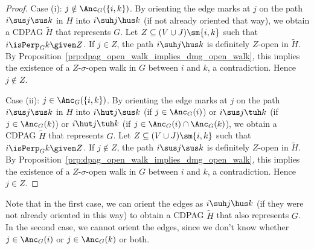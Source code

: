 \begin{proof}
%

  Case (i): $j \notin \Anc_G(\{i,k\})$. 
  By orienting the edge marks at $j$ on the path $i \sus j \sus k$ in $H$ into $i \suh j \hus k$ (if not already oriented that way), we obtain a CDPAG $\tilde{H}$ that represents $G$.
  Let $Z \subseteq (V \cup J) \sm \{i,k\}$ such that $i \isPerp_G k \given Z$. 
  If $j \in Z$, the path $i \suh j \hus k$ is definitely $Z$-open in $\tilde{H}$.
  By Proposition~\ref{prp:dpag_open_walk_implies_dmg_open_walk}, this implies the existence of a $Z$-$\sigma$-open walk in $G$ between $i$ and $k$, a contradiction.
  Hence $j \notin Z$.

  Case (ii): $j \in \Anc_G(\{i,k\})$.
  By orienting the edge marks at $j$ on the path $i \sus j \sus k$ in $H$ into $i \hut j \sus k$ (if $j \in \Anc_G(i)$) or $i \sus j \tuh k$ (if $j \in \Anc_G(k)$) or $i \hut j \tuh k$ (if $j \in \Anc_G(i) \cap \Anc_G(k)$), we obtain a CDPAG $\tilde{H}$ that represents $G$.
  Let $Z \subseteq (V \cup J) \sm \{i,k\}$ such that $i \isPerp_G k \given Z$. 
  If $j \notin Z$, the path $i \sus j \sus k$ is definitely $Z$-open in $\tilde{H}$.
  By Proposition~\ref{prp:dpag_open_walk_implies_dmg_open_walk}, this implies the existence of a $Z$-$\sigma$-open walk in $G$ between $i$ and $k$, a contradiction.
  Hence $j \in Z$.
\end{proof}
Note that in the first case, we can orient the edges as $i \suh j \hus k$ (if they were not already oriented in this way) to obtain a CDPAG $\tilde{H}$ that also represents $G$. 
In the second case, we cannot orient the edges, since we don't know whether $j \in \Anc_G(i)$ or $j \in \Anc_G(k)$ or both.

